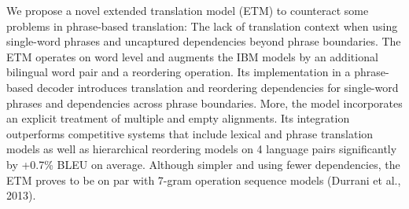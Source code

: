 We propose a novel extended translation model (ETM) to counteract some problems in phrase-based translation: The lack of translation context when using single-word phrases and uncaptured dependencies beyond phrase boundaries. The ETM operates on word level and augments the IBM models by an additional bilingual word pair and a reordering operation. Its implementation in a phrase-based decoder introduces translation and reordering dependencies for single-word phrases and dependencies across phrase boundaries. More, the model incorporates an explicit treatment of multiple and empty alignments. Its integration outperforms competitive systems that include lexical and phrase translation models as well as hierarchical reordering models on 4 language pairs significantly by +0.7\% BLEU on average. Although simpler and using fewer dependencies, the ETM proves to be on par with 7-gram operation sequence models (Durrani et al., 2013).
